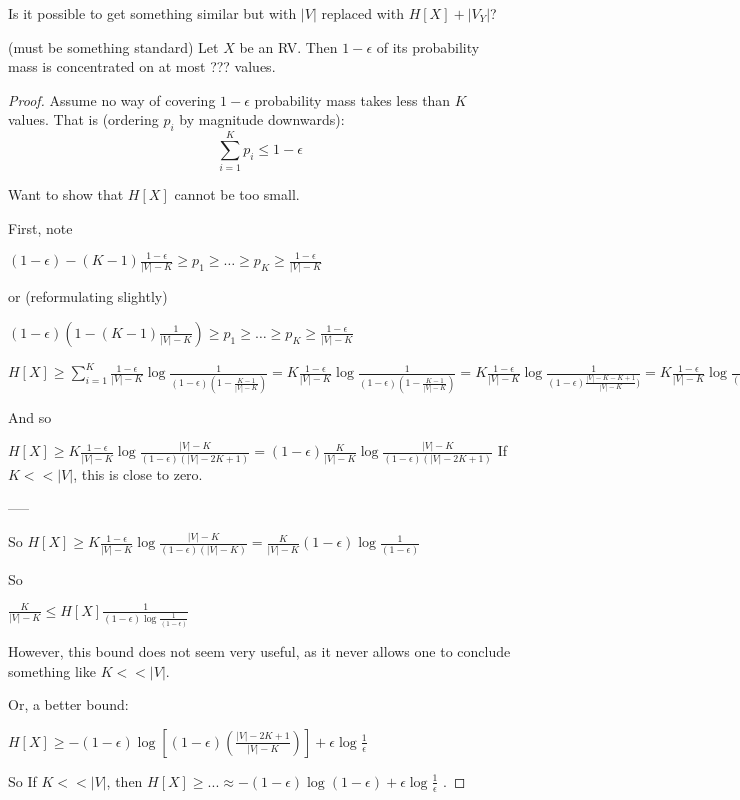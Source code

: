 Is it possible to get something similar but with $|V|$ replaced with $H[X]+|V_Y|$?

\begin{thm}(must be something standard)
Let $X$ be an RV. Then $1-\epsilon$ of its probability mass is concentrated on at most
???
values.
\end{thm}

\begin{proof}
Assume no way of covering $1-\epsilon$ probability mass takes less than $K$ values.
That is (ordering $p_i$ by magnitude downwards):
$$\sum_{i=1}^K p_i \leq 1-\epsilon$$

Want to show that $H[X]$ cannot be too small.

First, note

$(1-\epsilon) - (K-1) \frac{1-\epsilon}{|V|-K} \geq p_1 \geq \dots \geq p_K \geq \frac{1-\epsilon}{|V|-K}$

or (reformulating slightly)

$(1-\epsilon) (1 - (K-1) \frac{1}{|V|-K}) \geq p_1 \geq \dots \geq p_K \geq \frac{1-\epsilon}{|V|-K}$

$H[X] \geq \sum_{i=1}^K \frac{1-\epsilon}{|V|-K} \log \frac{1}{(1-\epsilon) (1 -  \frac{K-1}{|V|-K})} = K \frac{1-\epsilon}{|V|-K} \log \frac{1}{(1-\epsilon) (1 -  \frac{K-1}{|V|-K})} = K \frac{1-\epsilon}{|V|-K} \log \frac{1}{(1-\epsilon) \frac{|V|-K-K+1}{|V|-K})} = K \frac{1-\epsilon}{|V|-K} \log \frac{{|V|-K}}{(1-\epsilon) (|V|-2K+1)}$


And so


$H[X] \geq  K \frac{1-\epsilon}{|V|-K} \log \frac{{|V|-K}}{(1-\epsilon) (|V|-2K+1)} =  (1-\epsilon) \frac{K}{|V|-K} \log \frac{{|V|-K}}{(1-\epsilon) (|V|-2K+1)} $
If $K << |V|$, this is close to zero.

-----

So
$H[X] \geq K \frac{1-\epsilon}{|V|-K} \log \frac{{|V|-K}}{(1-\epsilon) (|V|-K)} = \frac{K}{|V|-K} (1-\epsilon) \log \frac{1}{(1-\epsilon)}$

So

$\frac{K}{|V|-K} \leq H[X] \frac{1}{(1-\epsilon) \log \frac{1}{(1-\epsilon)}}$

However, this bound does not seem very useful, as it never allows one to conclude something like $K << |V|$.

Or, a better bound:

$H[X] \geq  - (1-\epsilon) \log \left[ (1-\epsilon)  \left(\frac{|V|-2K+1}{|V|-K}\right) \right] + \epsilon \log \frac{1}{\epsilon}$

So If $K << |V|$, then $H[X] \geq ... \approx -(1-\epsilon) \log (1-\epsilon)  + \epsilon \log \frac{1}{\epsilon}$ .


\end{proof}


